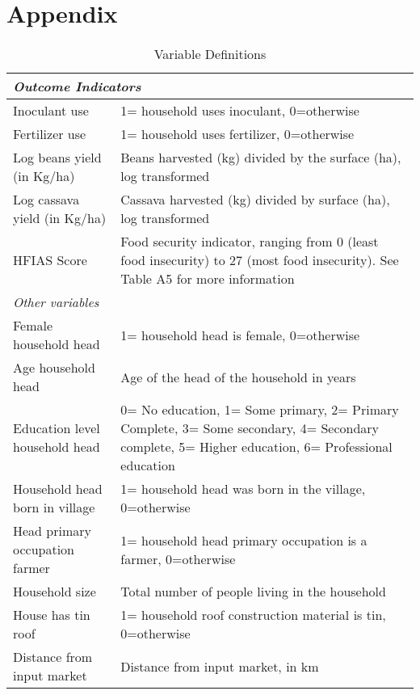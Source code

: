 \clearpage
\section{Appendix}
\setcounter{table}{0}
\renewcommand{\thetable}{A\arabic{table}}






\begin{table}[htbp]
	\scriptsize
	\caption{Variable Definitions}
	\label{tab:n2a_impact:vardef}
	\bgroup
	\def\arraystretch{1.3}
    \begin{tabular}{p{}p{}}
    \toprule
	
	\multicolumn{2}{l}{\textit{Outcome Indicators}}\\
	\midrule
	Inoculant use & 1= household uses inoculant, 0=otherwise\\
	Fertilizer use & 1= household uses fertilizer, 0=otherwise\\
	Log beans yield (in Kg/ha) & Beans harvested (kg) divided by the surface (ha), log transformed\\
	Log cassava yield (in Kg/ha) & Cassava harvested (kg) divided by surface (ha), log transformed\\
	HFIAS Score & Food security indicator, ranging from 0 (least food insecurity) to 27 (most food insecurity). See Table A5 for more information\\
	\multicolumn{2}{l}{\textit{Other variables}}\\
	\midrule
	Female household head & 1= household head is female, 0=otherwise\\
	Age household head  & Age of the head of the household in years \\
	Education level household head & 0= No education, 1= Some primary, 2= Primary Complete, 3= Some secondary, 4= Secondary complete, 5= Higher education, 6= Professional education\\
	Household head born in village & 1= household head was born in the village, 0=otherwise\\
	Head primary occupation farmer & 1= household head primary occupation is a farmer, 0=otherwise\\
	Household size & Total number of people living in the household\\
	House has tin roof & 1= household roof construction material is tin, 0=otherwise\\
	Distance from input market & Distance from input market, in km\\

\end{tabular}
\end{table}
